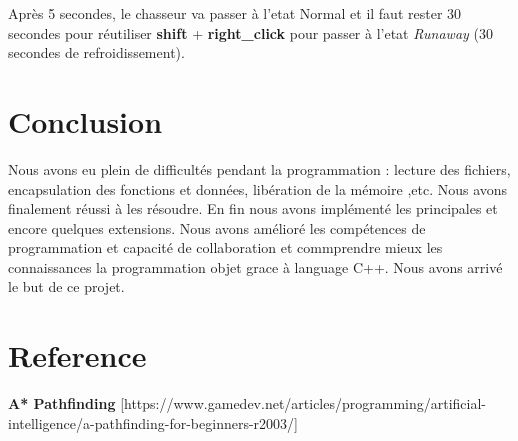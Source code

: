 \documentclass{article}
\begin{document}
Après 5 secondes, le chasseur va passer à l'etat Normal et il faut rester 30 secondes pour réutiliser \textbf{shift} + \textbf{right\_click} pour passer à l'etat \textsl{Runaway} (30 secondes de refroidissement).


\section{Conclusion}
Nous avons eu plein de difficultés pendant la programmation : lecture des fichiers, encapsulation des fonctions et données, libération de la mémoire ,etc. Nous avons finalement réussi à les résoudre. En fin nous avons implémenté les principales et encore quelques extensions. Nous avons amélioré les compétences de programmation et capacité de collaboration et commprendre mieux les connaissances la programmation objet grace à language C++. Nous avons arrivé le but de ce projet. 

\section{Reference}
\textbf{A* Pathfinding} [https://www.gamedev.net/articles/programming/artificial-intelligence/a-pathfinding-for-beginners-r2003/]

 
% 

\end{document}

